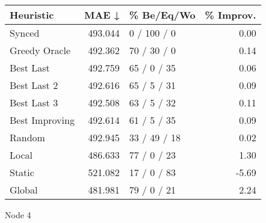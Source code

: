 \begin{tabular}{lrlr}
\toprule
\textbf{Heuristic} & \textbf{MAE ↓} & \textbf{\% Be/Eq/Wo} & \textbf{\% Improv.} \\
\midrule
            Synced &        493.044 &          0 / 100 / 0 &                0.00 \\
     Greedy Oracle &        492.362 &          70 / 30 / 0 &                0.14 \\
         Best Last &        492.759 &          65 / 0 / 35 &                0.06 \\
       Best Last 2 &        492.616 &          65 / 5 / 31 &                0.09 \\
       Best Last 3 &        492.508 &          63 / 5 / 32 &                0.11 \\
    Best Improving &        492.614 &          61 / 5 / 35 &                0.09 \\
            Random &        492.945 &         33 / 49 / 18 &                0.02 \\
             Local &        486.633 &          77 / 0 / 23 &                1.30 \\
            Static &        521.082 &          17 / 0 / 83 &               -5.69 \\
            Global &        481.981 &          79 / 0 / 21 &                2.24 \\
\bottomrule
\end{tabular}
\caption{Node 4}
\label{tab:iid_lr01_le1_bs4_4}
